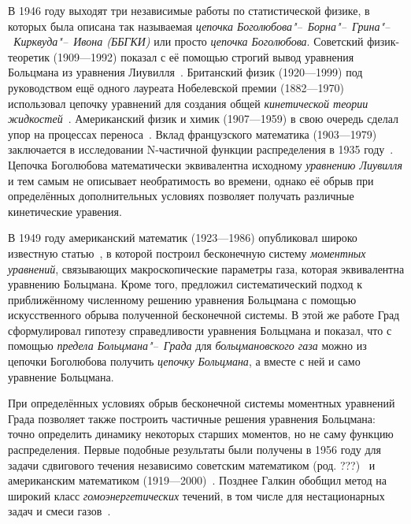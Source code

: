 \documentclass[a4paper, 12pt, oneside]{article} %
\begin{document}
В 1946 году выходят три независимые работы по статистической физике, в
которых была описана так называемая \emph{цепочка
Боголюбова"--~Борна"--~Грина"--~Кирквуда"--~Ивона (ББГКИ)} или просто
\emph{цепочка Боголюбова}. Советский физик-теоретик  (1909---1992) показал с её помощью строгий вывод уравнения
Больцмана из уравнения Лиувилля~\cite{bogolyubov1946kinetic}. Британский
физик  (1920---1999) под руководством ещё одного
лауреата Нобелевской премии  (1882---1970)
использовал цепочку уравнений для создания общей \emph{кинетической
теории жидкостей}~\cite{born1946general}. Американский физик и химик
 (1907---1959) в свою очередь сделал упор на
процессах переноса~\cite{kirkwood1946statistical}. Вклад французского
математика  (1903---1979) заключается в исследовании
N-частичной функции распределения в 1935 году~\cite{yvon1935theorie}.
Цепочка Боголюбова математически эквивалентна исходному \emph{уравнению
Лиувилля} и тем самым не описывает необратимость во времени, однако её
обрыв при определённых дополнительных условиях позволяет получать
различные кинетические уравения. 

В 1949 году американский математик  (1923---1986)
опубликовал широко известную статью~\cite{grad1949kinetic}, в которой
построил бесконечную систему \emph{моментных уравнений}, связывающих
макроскопические параметры газа, которая эквивалентна уравнению
Больцмана. Кроме того, предложил систематический подход к приближённому
численному решению уравнения Больцмана с помощью искусственного обрыва
полученной бесконечной системы. В этой же работе Град сформулировал
гипотезу справедливости уравнения Больцмана и показал, что с помощью
\emph{предела Больцмана"--~Града} для \emph{больцмановского газа} можно
из цепочки Боголюбова получить \emph{цепочку Больцмана}, а вместе с ней
и само уравнение Больцмана.

При определённых условиях обрыв бесконечной системы моментных уравнений
Града позволяет также построить частичные решения уравнения Больцмана:
точно определить динамику некоторых старших моментов, но не саму функцию
распределения. Первые подобные результаты были получены в 1956 году для задачи
сдвигового течения независимо советским математиком  (род. ???)~\cite{galkin1956solution} и американским
математиком 
(1919---2000)~\cite{truesdell1956pressures}. Позднее Галкин обобщил
метод на широкий класс \emph{гомоэнергетических} течений, в том числе
для нестационарных задач и смеси газов~\cite{galkin1956solutions}.
\end{document}
